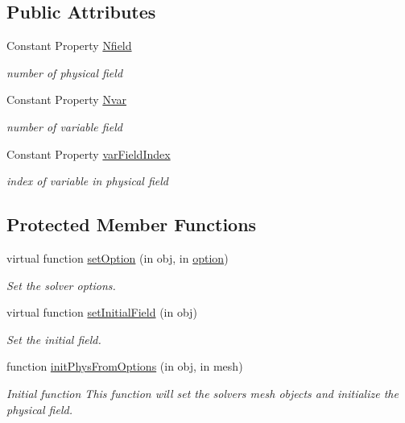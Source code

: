 \subsection*{Public Attributes}
\begin{DoxyCompactItemize}
\item 
Constant Property \hyperlink{class_ndg_phys_afe817605cd7f99c4ac04c23abfb3f10a}{Nfield}
\begin{DoxyCompactList}\small\item\em number of physical field \end{DoxyCompactList}\item 
Constant Property \hyperlink{class_ndg_phys_a5b3f89e37b6c7454274be60f5599c7b7}{Nvar}
\begin{DoxyCompactList}\small\item\em number of variable field \end{DoxyCompactList}\item 
Constant Property \hyperlink{class_ndg_phys_a9dfbc8c6a9bd2cae056f27bea2403371}{var\+Field\+Index}
\begin{DoxyCompactList}\small\item\em index of variable in physical field \end{DoxyCompactList}\end{DoxyCompactItemize}
\subsection*{Protected Member Functions}
\begin{DoxyCompactItemize}
\item 
virtual function \hyperlink{class_ndg_phys_a5cd323275f4098db166471c4b078ed17}{set\+Option} (in obj, in \hyperlink{class_ndg_phys_af91f4c54b93504e76b38a5693774dff1}{option})
\begin{DoxyCompactList}\small\item\em Set the solver options. \end{DoxyCompactList}\item 
virtual function \hyperlink{class_ndg_phys_a300c8d73472e9397d961b5d1aa5470e1}{set\+Initial\+Field} (in obj)
\begin{DoxyCompactList}\small\item\em Set the initial field. \end{DoxyCompactList}\item 
function \hyperlink{class_ndg_phys_a53ec826dcc552e4b26d010af282976d7}{init\+Phys\+From\+Options} (in obj, in mesh)
\begin{DoxyCompactList}\small\item\em Initial function This function will set the solver\textquotesingle{}s mesh objects and initialize the physical field. \end{DoxyCompactList}\end{DoxyCompactItemize}
